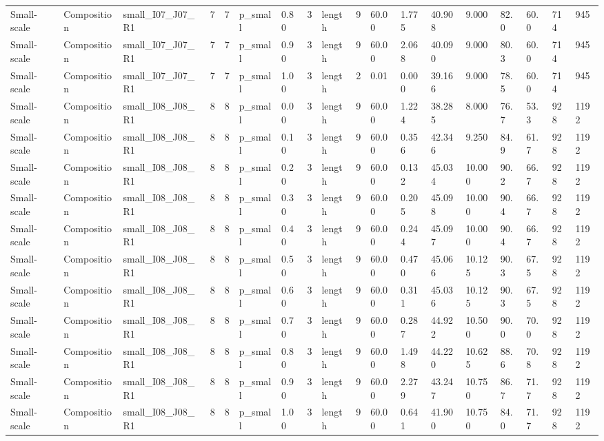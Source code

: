\begin{longtable}{lllrrllllrllllllll}
Small-scale & Composition & small\_I07\_J07\_R1 & 7 & 7 & p\_small & 0.80 & 3 & length & 9 & 60.00 & 1.775 & 40.908 & 9.000 & 82.0 & 60.0 & 714 & 945 \\
Small-scale & Composition & small\_I07\_J07\_R1 & 7 & 7 & p\_small & 0.90 & 3 & length & 9 & 60.00 & 2.068 & 40.090 & 9.000 & 80.3 & 60.0 & 714 & 945 \\
Small-scale & Composition & small\_I07\_J07\_R1 & 7 & 7 & p\_small & 1.00 & 3 & length & 2 & 0.01 & 0.000 & 39.166 & 9.000 & 78.5 & 60.0 & 714 & 945 \\
Small-scale & Composition & small\_I08\_J08\_R1 & 8 & 8 & p\_small & 0.00 & 3 & length & 9 & 60.00 & 1.224 & 38.285 & 8.000 & 76.7 & 53.3 & 928 & 1192 \\
Small-scale & Composition & small\_I08\_J08\_R1 & 8 & 8 & p\_small & 0.10 & 3 & length & 9 & 60.00 & 0.356 & 42.346 & 9.250 & 84.9 & 61.7 & 928 & 1192 \\
Small-scale & Composition & small\_I08\_J08\_R1 & 8 & 8 & p\_small & 0.20 & 3 & length & 9 & 60.00 & 0.132 & 45.034 & 10.000 & 90.2 & 66.7 & 928 & 1192 \\
Small-scale & Composition & small\_I08\_J08\_R1 & 8 & 8 & p\_small & 0.30 & 3 & length & 9 & 60.00 & 0.205 & 45.098 & 10.000 & 90.4 & 66.7 & 928 & 1192 \\
Small-scale & Composition & small\_I08\_J08\_R1 & 8 & 8 & p\_small & 0.40 & 3 & length & 9 & 60.00 & 0.244 & 45.097 & 10.000 & 90.4 & 66.7 & 928 & 1192 \\
Small-scale & Composition & small\_I08\_J08\_R1 & 8 & 8 & p\_small & 0.50 & 3 & length & 9 & 60.00 & 0.470 & 45.066 & 10.125 & 90.3 & 67.5 & 928 & 1192 \\
Small-scale & Composition & small\_I08\_J08\_R1 & 8 & 8 & p\_small & 0.60 & 3 & length & 9 & 60.00 & 0.311 & 45.036 & 10.125 & 90.3 & 67.5 & 928 & 1192 \\
Small-scale & Composition & small\_I08\_J08\_R1 & 8 & 8 & p\_small & 0.70 & 3 & length & 9 & 60.00 & 0.287 & 44.922 & 10.500 & 90.0 & 70.0 & 928 & 1192 \\
Small-scale & Composition & small\_I08\_J08\_R1 & 8 & 8 & p\_small & 0.80 & 3 & length & 9 & 60.00 & 1.498 & 44.220 & 10.625 & 88.6 & 70.8 & 928 & 1192 \\
Small-scale & Composition & small\_I08\_J08\_R1 & 8 & 8 & p\_small & 0.90 & 3 & length & 9 & 60.00 & 2.279 & 43.247 & 10.750 & 86.7 & 71.7 & 928 & 1192 \\
Small-scale & Composition & small\_I08\_J08\_R1 & 8 & 8 & p\_small & 1.00 & 3 & length & 9 & 60.00 & 0.641 & 41.900 & 10.750 & 84.0 & 71.7 & 928 & 1192 \\

\end{longtable}
